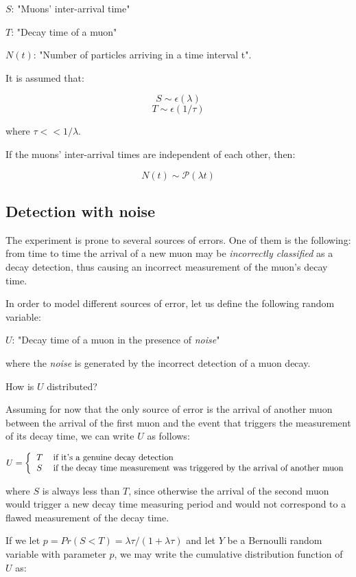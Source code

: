 \documentclass[11pt,A4paper]{article}
\begin{document}
$S$: "Muons' inter-arrival time"

$T$: "Decay time of a muon"

$N(t)$: "Number of particles arriving in a time interval t".

\medskip
It is assumed that:

\[S \sim \epsilon(\lambda)\]
\[T \sim \epsilon(1/\tau)\]

where $\tau << 1/\lambda$.

If the muons' inter-arrival times are independent of each other, then:

\[N(t) \sim \mathcal{P}(\lambda t)\]

\subsection{Detection with noise}
The experiment is prone to several sources of errors. One of them is the following: from time to time the arrival of a new muon may be \textit{incorrectly classified} as a decay detection, thus causing an incorrect measurement of the muon's decay time.

\medskip
In order to model different sources of error, let us define the following random variable:

$U$: "Decay time of a muon in the presence of \textit{noise}"

where the \textit{noise} is generated by the incorrect detection of a muon decay.

\medskip
How is $U$ distributed?


Assuming for now that the only source of error is the arrival of another muon between the arrival of the first muon and the event that triggers the measurement of its decay time, we can write $U$ as follows:

\[ \\
U =
\left \{
  \begin{tabular}{ll}
  $T$ & \textrm{if it's a genuine decay detection} \\
  $S$ & \textrm{if the decay time measurement was triggered by the arrival of another muon} \\
  \end{tabular}
\right.
\]

where $S$ is always less than $T$, since otherwise the arrival of the second muon would trigger a new decay time measuring period and would not correspond to a flawed measurement of the decay time.

If we let $p = Pr(S < T) = \lambda \tau /(1+\lambda \tau)$ and let $Y$ be a Bernoulli random variable with parameter $p$, we may write the cumulative distribution function of $U$ as:
\end{document}
